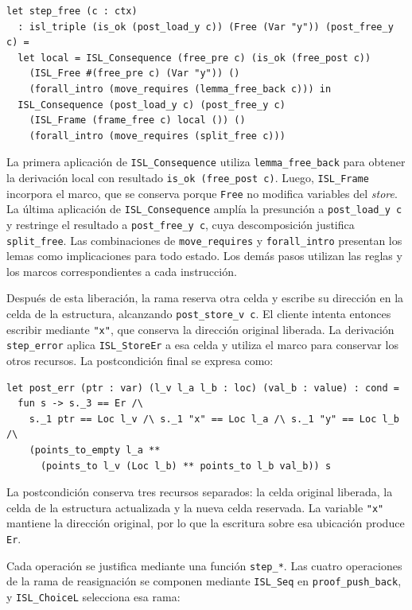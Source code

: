\documentclass[a4paper,	11pt]{report}
\begin{document}
\begin{lstlisting}
let step_free (c : ctx)
  : isl_triple (is_ok (post_load_y c)) (Free (Var "y")) (post_free_y c) =
  let local = ISL_Consequence (free_pre c) (is_ok (free_post c))
    (ISL_Free #(free_pre c) (Var "y")) ()
    (forall_intro (move_requires (lemma_free_back c))) in
  ISL_Consequence (post_load_y c) (post_free_y c)
    (ISL_Frame (frame_free c) local ()) ()
    (forall_intro (move_requires (split_free c)))
\end{lstlisting}
La primera aplicación de \lstinline|ISL_Consequence| utiliza \lstinline|lemma_free_back| para obtener la derivación local
con resultado \lstinline|is_ok (free_post c)|.
Luego,
\lstinline|ISL_Frame| incorpora el marco,
que se conserva porque \lstinline|Free| no modifica variables del \emph{store}.
La última aplicación de \lstinline|ISL_Consequence| amplía la presunción a \lstinline|post_load_y c| y restringe el resultado a \lstinline|post_free_y c|,
cuya descomposición justifica \lstinline|split_free|.
Las combinaciones de \lstinline|move_requires| y \lstinline|forall_intro| presentan los lemas como implicaciones para todo estado.
Los demás pasos utilizan las reglas y los marcos correspondientes a cada instrucción.

Después de esta liberación,
la rama reserva otra celda y escribe su dirección en la celda de la estructura,
alcanzando \lstinline|post_store_v c|.
El cliente intenta entonces escribir mediante \lstinline|"x"|,
que conserva la dirección original liberada.
La derivación \lstinline|step_error| aplica \lstinline|ISL_StoreEr| a esa celda y utiliza el marco para conservar los otros recursos.
La postcondición final se expresa como:

\begin{lstlisting}
let post_err (ptr : var) (l_v l_a l_b : loc) (val_b : value) : cond =
  fun s -> s._3 == Er /\
    s._1 ptr == Loc l_v /\ s._1 "x" == Loc l_a /\ s._1 "y" == Loc l_b /\
    (points_to_empty l_a **
      (points_to l_v (Loc l_b) ** points_to l_b val_b)) s
\end{lstlisting}
La postcondición conserva tres recursos separados:
la celda original liberada,
la celda de la estructura actualizada y la nueva celda reservada.
La variable \lstinline|"x"| mantiene la dirección original,
por lo que la escritura sobre esa ubicación produce \lstinline|Er|.

Cada operación se justifica mediante una función \lstinline|step_*|.
Las cuatro operaciones de la rama de reasignación se componen mediante \lstinline|ISL_Seq| en \lstinline|proof_push_back|,
y \lstinline|ISL_ChoiceL| selecciona esa rama:
\end{document}
